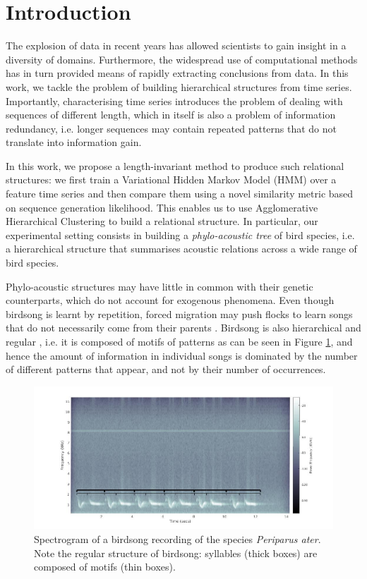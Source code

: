 \documentclass[pdftex,11pt,a4paper]{article}
\theoremstyle{definition}
\theoremstyle{remark}
\begin{document}
\section{Introduction}
\label{section_introduction}
The explosion of data in recent years has allowed scientists to gain insight in a diversity of domains. Furthermore, the widespread use of computational methods has in turn provided means of rapidly extracting conclusions from data. In this work, we tackle the problem of building hierarchical structures from time series. Importantly, characterising time series introduces the problem of dealing with sequences of different length, which in itself is also a problem of information redundancy, i.e. longer sequences may contain repeated patterns that do not translate into information gain.
\par In this work, we propose a length-invariant method to produce such relational structures: we first train a Variational Hidden Markov Model (HMM) over a feature time series and then compare them using a novel similarity metric based on sequence generation likelihood. This enables us to use Agglomerative Hierarchical Clustering to build a relational structure. In particular, our experimental setting consists in building a \textit{phylo-acoustic tree} of bird species, i.e. a hierarchical structure that summarises acoustic relations across a wide range of bird species.
\par Phylo-acoustic structures may have little in common with their genetic counterparts, which do not account for exogenous phenomena. Even though birdsong is learnt by repetition, forced migration may push flocks to learn songs that do not necessarily come from their parents \cite{Berwick2013}. Birdsong is also hierarchical and regular \cite{Snowdon2013}, i.e. it is composed of motifs of patterns as can be seen in Figure \ref{fig_birdsong_structure}, and hence the amount of information in individual songs is dominated by the number of different patterns that appear, and not by their number of occurrences. 

\begin{figure}[t]
\centering
\includegraphics[width=\textwidth]{images/birdsong_structure.jpg}
\caption{Spectrogram of a birdsong recording of the species \emph{Periparus ater}. Note the regular structure of birdsong: syllables (thick boxes) are composed of motifs (thin boxes).}
\label{fig_birdsong_structure}
\end{figure}
\end{document}
